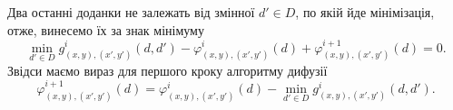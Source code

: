 Два останні доданки не залежать від змінної $d' \in D$, по якій йде мінімізація,
отже, винесемо їх за знак мінімуму
\begin{equation*}
    \min \limits_{d' \in D}
        g_{\left(x, y \right), \left(x', y' \right)}^{i} \left( d, d' \right) -
    \varphi_{\left(x, y \right), \left(x', y' \right)}^{i} \left( d \right) +
    \varphi_{\left(x, y \right), \left(x', y' \right)}^{i + 1} \left( d \right) =
    0.
\end{equation*}
Звідси маємо вираз для першого кроку алгоритму дифузії
\begin{equation*}
    \varphi_{\left(x, y \right), \left(x', y' \right)}^{i + 1} \left( d \right) =
    \varphi_{\left(x, y \right), \left(x', y' \right)}^{i} \left( d \right) -
    \min \limits_{d' \in D}
        g_{\left(x, y \right), \left(x', y' \right)}^{i} \left( d, d' \right).
\end{equation*}

